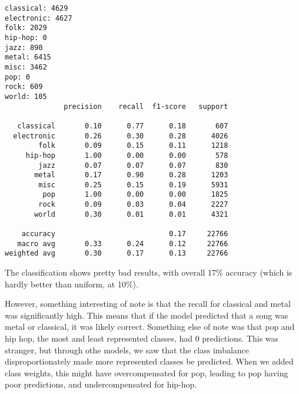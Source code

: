 \documentclass[11pt]{article}
\begin{document}
    \begin{Verbatim}[commandchars=\\\{\}]
classical: 4629
electronic: 4627
folk: 2029
hip-hop: 0
jazz: 890
metal: 6415
misc: 3462
pop: 0
rock: 609
world: 105
              precision    recall  f1-score   support

   classical       0.10      0.77      0.18       607
  electronic       0.26      0.30      0.28      4026
        folk       0.09      0.15      0.11      1218
     hip-hop       1.00      0.00      0.00       578
        jazz       0.07      0.07      0.07       830
       metal       0.17      0.90      0.28      1203
        misc       0.25      0.15      0.19      5931
         pop       1.00      0.00      0.00      1825
        rock       0.09      0.03      0.04      2227
       world       0.30      0.01      0.01      4321

    accuracy                           0.17     22766
   macro avg       0.33      0.24      0.12     22766
weighted avg       0.30      0.17      0.13     22766

    \end{Verbatim}

    The classification shows pretty bad results, with overall 17\% accuracy
(which is hardly better than uniform, at 10\%).

However, something interesting of note is that the recall for classical
and metal was significantly high. This means that if the model predicted
that a song was metal or classical, it was likely correct. Something
else of note was that pop and hip hop, the most and least represented
classes, had 0 predictions. This was stranger, but through othe models,
we saw that the class imbalance disproportionately made more represented
classes be predicted. When we added class weights, this might have
overcompensated for pop, leading to pop having poor predictions, and
undercompensated for hip-hop.
\end{document}
